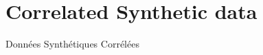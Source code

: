 
\newpage

\section{Correlated Synthetic data}{Données Synthétiques Corrélées}

\label{app:sec:correlatedsyntheticdata}


















